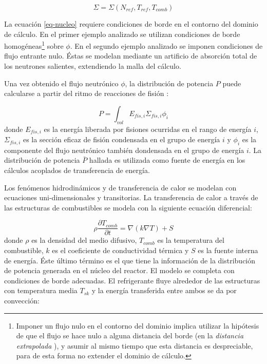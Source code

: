 \begin{equation}
\Sigma = \Sigma \left ( N_{ref}, T_{ref}, T_{comb} \right )
\label{eq-sigma}
\end{equation}

La ecuación \ref{eq-nucleo} requiere condiciones de borde en el contorno del dominio de cálculo.
En el primer ejemplo analizado se utilizan condiciones de borde homogéneas\footnote{
Imponer un flujo nulo en el contorno del dominio implica utilizar la hipótesis de que el flujo se hace nulo a alguna distancia del borde (en la \textit{distancia extrapolada} \cite{lamarsh}),
y asumir al mismo tiempo que esta distancia es despreciable, para de esta forma no extender el dominio de cálculo.
} sobre $\phi$.
En el segundo ejemplo analizado se imponen condiciones de flujo entrante nulo.
Éstas se modelan mediante un artificio de absorción total de los neutrones salientes, extendiendo la malla del cálculo.

Una vez obtenido el flujo neutrónico $\phi$,
la distribución de potencia $P$ puede calcularse a partir del ritmo de reacciones de fisión \cite{lamarsh}:

\begin{equation}
P = \int_{vol} E_{fis,i} \Sigma_{fis,i} \phi_{i}
\label{power}
\end{equation}
donde $E_{fis,i}$ es la energía liberada por fisiones ocurridas en el rango de energía $i$,
$\Sigma_{fis,i}$ es la sección eficaz de fisión condensada en el grupo de energía $i$ y
$\phi_{i}$ es la componente del flujo neutrónico también dondensada en el grupo de energía $i$.
La distribución de potencia $\bar{P}$ hallada es utilizada como fuente de energía en los cálculos acoplados de transferencia de energía.

Los fenómenos hidrodinámicos y de transferencia de calor se modelan con ecuaciones uni-dimensionales y transitorias.
La transferencia de calor a través de las estructuras de combustibles se modela con la siguiente ecuación diferencial:

\begin{equation}
\rho \frac{\partial T_{comb}}{\partial t} = \nabla \left ( k \nabla T \right )  + S
\label{relap-calor}
\end{equation}
donde $\rho$ es la densidad del medio difusivo,
$T_{comb}$ es la temperatura del combustible,
$k$ es el coeficiente de conductividad térmica y
$S$ es la fuente interna de energía.
Éste último término es el que tiene la información de la distribución de potencia generada en el núcleo del reactor.
El modelo se completa con condiciones de borde adecuadas.
El refrigerante fluye alrededor de las estructuras con temperatura media $T_{sk}$ y la energía transferida entre ambos se da por convección:

